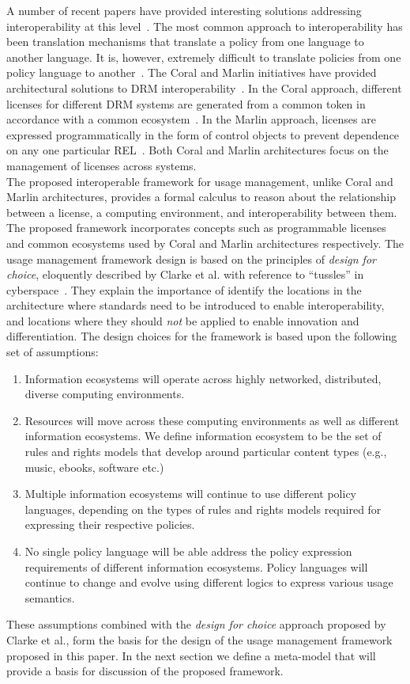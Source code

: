 A number of recent papers have provided interesting solutions addressing interoperability at this level~\cite{marlin,coral,KoLaMaMi:04,SaShUe:04,ScTaWo:04}. The most common approach to interoperability has been translation mechanisms that translate a policy from one language to another language.  It is, however,  extremely difficult to translate policies from one policy language to another~\cite{HeJa:05}. The Coral and Marlin initiatives have provided architectural solutions to DRM interoperability~\cite{marlin,coral}. In the Coral approach, different licenses for different DRM systems are generated from a common token in accordance with a common ecosystem~\cite{coral}. In the Marlin approach, licenses are expressed programmatically in the form of control objects to prevent dependence on any one particular REL~\cite{marlin}. Both Coral and Marlin architectures focus on the management of licenses across systems.\\ 

The proposed interoperable framework for usage management, unlike Coral and Marlin architectures, provides a formal calculus to reason about the relationship between a license, a computing environment, and interoperability between them. The proposed framework incorporates concepts such as programmable licenses and common ecosystems used by Coral and Marlin architectures respectively. The usage management framework design is based on the principles of {\em design for choice}, eloquently described by Clarke et al. with reference to ``tussles'' in cyberspace~\cite{ClWrSoBr:02}. They explain the importance of identify the locations in the architecture where standards need to be introduced to enable interoperability, and locations where they should {\em not} be applied to enable innovation and differentiation. The design choices for the framework is based upon the following set of assumptions: 

\begin{enumerate}
\item Information ecosystems will operate across highly networked, distributed, diverse computing environments. 
\item Resources will move across these computing environments as well as different information ecosystems. We define information ecosystem to be the set of rules and rights models that develop around particular content types (e.g., music, ebooks, software etc.) 
\item Multiple information ecosystems will continue to use different policy languages, depending on the types of rules and rights models required for expressing their respective policies.
\item No single policy language will be able address the policy expression requirements of different information ecosystems. Policy languages will continue to change and evolve using different logics to express various usage semantics. 
\end{enumerate}

These assumptions combined with the {\em design for choice} approach proposed by Clarke et al., form the basis for the design of the usage management framework proposed in this paper. In the next section we define a meta-model that will provide a basis for discussion of the proposed framework.
